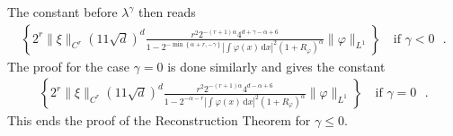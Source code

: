The constant before \(\lambda^\gamma\)  then reads
\begin{align}\label{holy-molly}
   \left\{ 2^r \lVert \xi \rVert_{C^r} (11 \sqrt d)^d \frac{r^2 2^{-(r+1) \alpha} 4^{d + \gamma - \alpha + 6}}{1-2^{- \min\left\{ \alpha + r, -\gamma \right\}} |\int \varphi(x) \, \mathrm{d}x|^2  (1 + R_\varphi)^{\alpha}} \lVert \varphi \rVert_{L^1} \right\} \quad \text{if \(\gamma < 0\) }.
\end{align}
The proof for the case \(\gamma = 0\) is done similarly and gives the constant 
\begin{align}\label{holy-mollyl}
    \left\{ 2^r \lVert \xi \rVert_{C^r} (11 \sqrt d)^d \frac{r^2 2^{-(r+1) \alpha} 4^{d - \alpha + 6}}{1-2^{- \alpha - r} |\int \varphi(x) \, \mathrm{d}x|^2  (1 + R_\varphi)^{\alpha}} \lVert \varphi \rVert_{L^1} \right\} \quad \text{if \(\gamma = 0\) }.
\end{align}
This ends the proof of the Reconstruction Theorem for \(\gamma \leq 0\). 